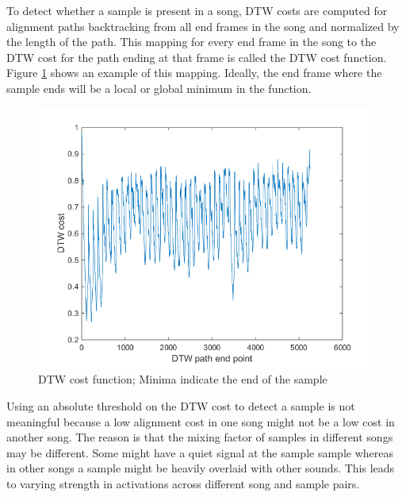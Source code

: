 \documentclass{article}
\begin{document}
To detect whether a sample is present in a song, DTW costs are computed for alignment paths backtracking from all end frames in the song and normalized by the length of the path. This mapping for every end frame in the song to the DTW cost for the path ending at that frame is called the DTW cost function. Figure \ref{fig3} shows an example of this mapping. Ideally, the end frame where the sample ends will be a local or global minimum in the function.

\begin{figure}[!ht]
\centering
\includegraphics[width=\linewidth]{DTWcost.png}
\caption{DTW cost function; Minima indicate the end of the sample}
\label{fig3}
\end{figure}




Using an absolute threshold on the DTW cost to detect a sample is not meaningful because a low alignment cost in one song might not be a low cost in another song. The reason is that the mixing factor of samples in different songs may be different. Some might have a quiet signal at the sample sample whereas in other songs a sample might be heavily overlaid with other sounds. This leads to varying strength in activations across different song and sample pairs. 
\end{document}
